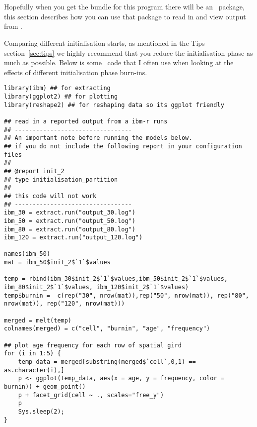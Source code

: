 \section{ \label{sec:post-processing}}

Hopefully when you get the bundle for this program there will be an \R\ package, this section describes how you can use that package to read in and view output from \IBM.





Comparing different initialisation starts, as mentioned in the Tips section~\ref{sec:tips} we highly recommend that you reduce the initialisation phase as much as possible. Below is some \R\ code that I often use when looking at the effects of different initialisation phase burn-ins.

\begin{lstlisting}
library(ibm) ## for extracting
library(ggplot2) ## for plotting
library(reshape2) ## for reshaping data so its ggplot friendly

## read in a reported output from a ibm-r runs
## ---------------------------------
## An important note before running the models below.
## if you do not include the following report in your configuration files
##
## @report init_2
## type initialisation_partition
##
## this code will not work
## ---------------------------------
ibm_30 = extract.run("output_30.log")
ibm_50 = extract.run("output_50.log")
ibm_80 = extract.run("output_80.log")
ibm_120 = extract.run("output_120.log")

names(ibm_50)
mat = ibm_50$init_2$`1`$values

temp = rbind(ibm_30$init_2$`1`$values,ibm_50$init_2$`1`$values, ibm_80$init_2$`1`$values, ibm_120$init_2$`1`$values)
temp$burnin =  c(rep("30", nrow(mat)),rep("50", nrow(mat)), rep("80", nrow(mat)), rep("120", nrow(mat)))

merged = melt(temp)
colnames(merged) = c("cell", "burnin", "age", "frequency")

## plot age frequency for each row of spatial gird
for (i in 1:5) {
	temp_data = merged[substring(merged$`cell`,0,1) == as.character(i),]
	p <- ggplot(temp_data, aes(x = age, y = frequency, color = burnin)) + geom_point()
	p + facet_grid(cell ~ ., scales="free_y")
	p
    Sys.sleep(2);
}
\end{lstlisting}



